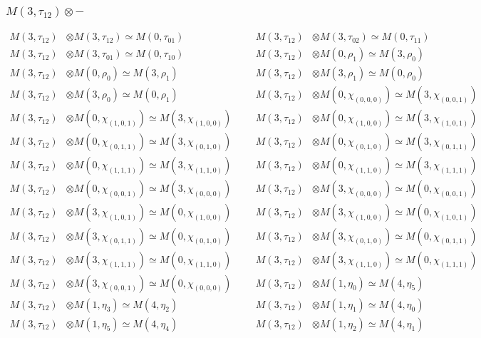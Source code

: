 \subsubsection{$ M(3,\tau_{12})\otimes -$}
\begin{align*}
M(3,\tau_{12}) &\otimes M(3,\tau_{12}) \simeq M(0,\tau_{01}) &&& M(3,\tau_{12}) &\otimes M(3,\tau_{02}) \simeq M(0,\tau_{11})\\
M(3,\tau_{12}) &\otimes M(3,\tau_{01}) \simeq M(0,\tau_{10}) &&& M(3,\tau_{12}) &\otimes M(0,\rho_{1}) \simeq M(3,\rho_{0})\\
M(3,\tau_{12}) &\otimes M(0,\rho_{0}) \simeq M(3,\rho_{1}) &&& M(3,\tau_{12}) &\otimes M(3,\rho_{1}) \simeq M(0,\rho_{0})\\
M(3,\tau_{12}) &\otimes M(3,\rho_{0}) \simeq M(0,\rho_{1}) &&& M(3,\tau_{12}) &\otimes M(0,\chi_{(0,0,0)}) \simeq M(3,\chi_{(0,0,1)})\\
M(3,\tau_{12}) &\otimes M(0,\chi_{(1,0,1)}) \simeq M(3,\chi_{(1,0,0)}) &&& M(3,\tau_{12}) &\otimes M(0,\chi_{(1,0,0)}) \simeq M(3,\chi_{(1,0,1)})\\
M(3,\tau_{12}) &\otimes M(0,\chi_{(0,1,1)}) \simeq M(3,\chi_{(0,1,0)}) &&& M(3,\tau_{12}) &\otimes M(0,\chi_{(0,1,0)}) \simeq M(3,\chi_{(0,1,1)})\\
M(3,\tau_{12}) &\otimes M(0,\chi_{(1,1,1)}) \simeq M(3,\chi_{(1,1,0)}) &&& M(3,\tau_{12}) &\otimes M(0,\chi_{(1,1,0)}) \simeq M(3,\chi_{(1,1,1)})\\
M(3,\tau_{12}) &\otimes M(0,\chi_{(0,0,1)}) \simeq M(3,\chi_{(0,0,0)}) &&& M(3,\tau_{12}) &\otimes M(3,\chi_{(0,0,0)}) \simeq M(0,\chi_{(0,0,1)})\\
M(3,\tau_{12}) &\otimes M(3,\chi_{(1,0,1)}) \simeq M(0,\chi_{(1,0,0)}) &&& M(3,\tau_{12}) &\otimes M(3,\chi_{(1,0,0)}) \simeq M(0,\chi_{(1,0,1)})\\
M(3,\tau_{12}) &\otimes M(3,\chi_{(0,1,1)}) \simeq M(0,\chi_{(0,1,0)}) &&& M(3,\tau_{12}) &\otimes M(3,\chi_{(0,1,0)}) \simeq M(0,\chi_{(0,1,1)})\\
M(3,\tau_{12}) &\otimes M(3,\chi_{(1,1,1)}) \simeq M(0,\chi_{(1,1,0)}) &&& M(3,\tau_{12}) &\otimes M(3,\chi_{(1,1,0)}) \simeq M(0,\chi_{(1,1,1)})\\
M(3,\tau_{12}) &\otimes M(3,\chi_{(0,0,1)}) \simeq M(0,\chi_{(0,0,0)}) &&& M(3,\tau_{12}) &\otimes M(1,\eta_{0}) \simeq M(4,\eta_{5})\\
M(3,\tau_{12}) &\otimes M(1,\eta_{3}) \simeq M(4,\eta_{2}) &&& M(3,\tau_{12}) &\otimes M(1,\eta_{1}) \simeq M(4,\eta_{0})\\
M(3,\tau_{12}) &\otimes M(1,\eta_{5}) \simeq M(4,\eta_{4}) &&& M(3,\tau_{12}) &\otimes M(1,\eta_{2}) \simeq M(4,\eta_{1})\\

\end{align*}
